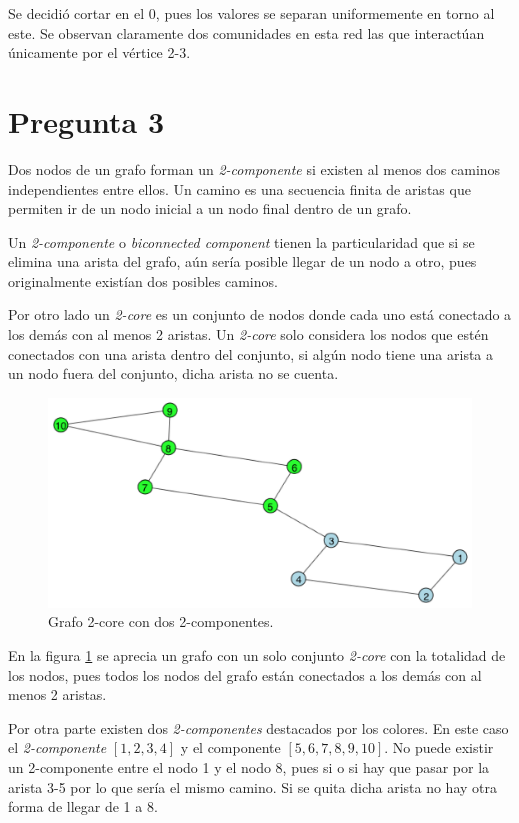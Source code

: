 \documentclass[letterpaper]{article}
\begin{document}
Se decidió cortar en el 0, pues los valores se separan uniformemente en torno al este. Se observan claramente dos comunidades en esta red las que interactúan únicamente por el vértice 2-3.





\section{Pregunta 3}
Dos nodos de un grafo forman un \textit{2-componente} si existen al menos dos caminos independientes entre ellos. Un camino es una secuencia finita de aristas que permiten ir de un nodo inicial a un nodo final dentro de un grafo.

Un \textit{2-componente} o \textit{biconnected component} tienen la particularidad que si se elimina una arista del grafo, aún sería posible llegar de un nodo a otro, pues originalmente existían dos posibles caminos.

Por otro lado un \textit{2-core} es un conjunto de nodos donde cada uno está conectado a los demás con al menos 2 aristas. Un \textit{2-core} solo considera los nodos que estén conectados con una arista dentro del conjunto, si algún nodo tiene una arista a un nodo fuera del conjunto, dicha arista no se cuenta.



\begin{figure}[H]
  \centering
  \includegraphics[width=.6\linewidth]{img/p3.png}
  \caption{ Grafo 2-core con dos 2-componentes.}
  \label{red:3}
\end{figure}

En la figura \ref{red:3} se aprecia un grafo con un solo conjunto \textit{2-core} con la totalidad de los nodos, pues todos los nodos del grafo están conectados a los demás con al menos 2 aristas.

Por otra parte existen dos \textit{2-componentes} destacados por los colores. En este caso el \textit{2-componente} $\left[1,2,3,4\right]$ y el componente $\left[5,6,7,8,9,10\right]$. No puede existir un 2-componente entre el nodo 1 y el nodo 8, pues si o si hay que pasar por la arista 3-5 por lo que sería el mismo camino. Si se quita dicha arista no hay otra forma de llegar de 1 a 8.
\end{document}
